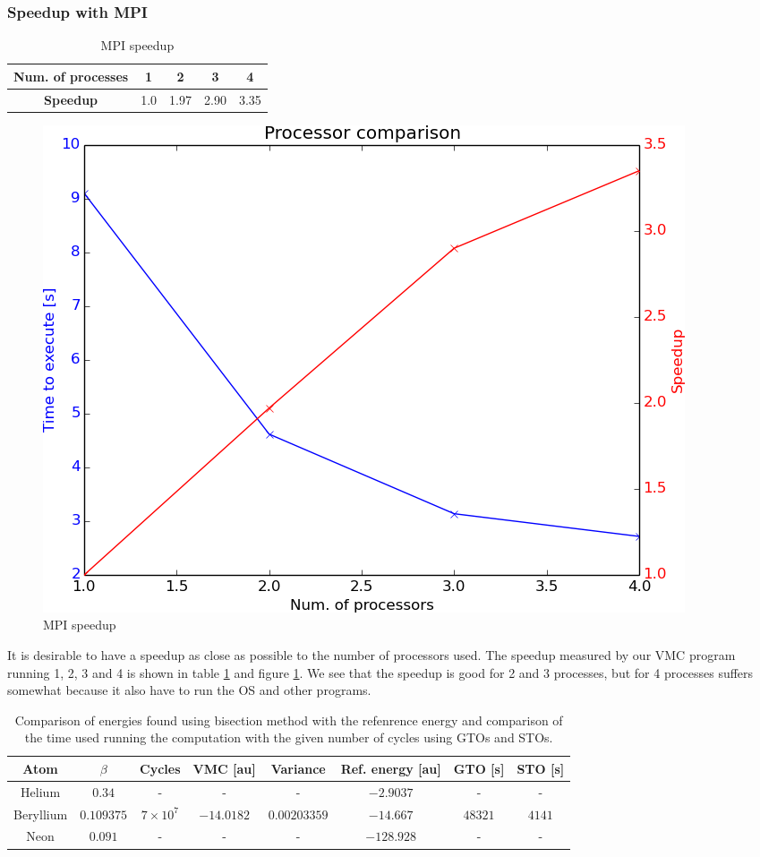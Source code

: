 	\subsubsection{Speedup with MPI}
		\begin{table}
			\center
			\begin{tabular}{| c | c| c| c| c|}
				\hline
					\textbf{Num. of processes} &	1	&	2	&	3	&	4
				\\ \hline
				\textbf{Speedup}	&	1.0	&	1.97	&	2.90	&	3.35
				\\	\hline
			\end{tabular}
			\caption{MPI speedup}
			\label{tab:MPI_speedup}
		\end{table}

		\begin{figure}
			\centering \includegraphics[width=0.45\linewidth]{../figures/processor_number_time_comparison}
			\protect\caption{MPI speedup}
			\label{fig:MPI_speedup}
		\end{figure}

		It is desirable to have a speedup as close as possible to the number of processors used. The speedup measured by our VMC program running 1, 2, 3 and 4 is shown in table \ref{tab:MPI_speedup} and figure \ref{fig:MPI_speedup}. We see that the speedup is good for 2 and 3 processes, but for 4 processes suffers somewhat because it also have to run the OS and other programs.


		\begin{table}
			\center %
			\begin{tabular}{|c|c|c|c|c|c|c|c|}
				\hline 
				Atom  & $\beta$ & Cycles & VMC {[}au{]} & Variance & Ref. energy {[}au{]} & GTO [s] & STO [s] \tabularnewline
				\hline 
				Helium &  $0.34$ & - & - & - & $-2.9037$ & - & - \tabularnewline
				\hline 
				Beryllium  &  $0.109375$ & $7\times 10^{7}$ & $-14.0182$ & $0.00203359$ & $-14.667$ & $48321$ & $4141$ \tabularnewline
				\hline 
				Neon  & $0.091$ & - & - & - & $-128.928$ & - & - \tabularnewline
				\hline 
			\end{tabular}\protect\caption{ Comparison of energies found using bisection method with the refenrence energy \parencite{Koput_2011_PCCP} \parencite{Binkley_1975} and comparison of the time used running the computation with the given number of cycles using GTOs and STOs.}
			\label{tab:AtomsGTO} 
		\end{table}